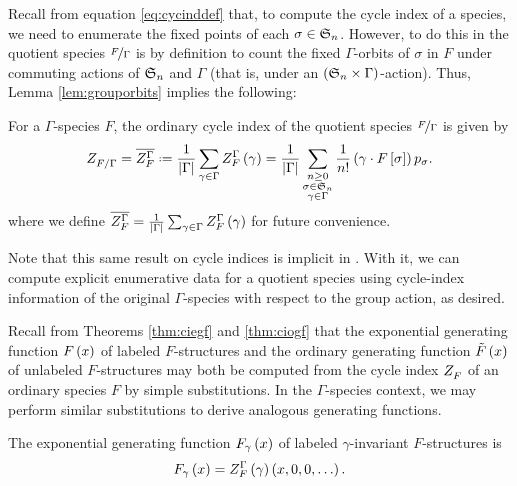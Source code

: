 \documentclass[distribution,draft]{brandiss} %
\numberwithin{section}{chapter}
\numberwithin{figure}{chapter}
\begin{document}
Recall from equation \eqref{eq:cycinddef} that, to compute the cycle index of a species, we need to enumerate the fixed points of each $\sigma \in  \mathfrak{S}_{n} $.
However, to do this in the quotient species $\nicefrac{F}{\Gamma}$ is by definition to count the fixed $\Gamma$-orbits of $\sigma$ in $F$ under commuting actions of $ \mathfrak{S}_{n} $ and $\Gamma$ (that is, under an $\left( { \mathfrak{S}_{n}  \times \Gamma} \right)$-action).
Thus, Lemma \ref{lem:grouporbits} implies the following:
\begin{theorem}\label{thm:qsci}
  For a $\Gamma$-species $F$, the ordinary cycle index of the quotient species $\nicefrac{F}{\Gamma}$ is given by 
  \begin{equation}
    \label{eq:quotcycind}
    \ci{F / \Gamma} = \qgci{\Gamma}{F} \defeq \frac{1}{\abs{\Gamma}} \sum_{\gamma \in \Gamma} \gcielt{\Gamma}{F}{\gamma} = \frac{1}{\abs{\Gamma}} \sum_{\substack{n \geq 0 \\ \sigma \in \symgp{n} \\ \gamma \in \Gamma}} \frac{1}{n!} \pbrac{\gamma \cdot F \sbrac{\sigma}} p_{\sigma}.
  \end{equation}
  where we define $ \overline{  Z_{F}^{{\Gamma} {}}  }  = \frac{1}{\left\vert {\Gamma} \right\vert} \sum_{\gamma \in \Gamma}  Z_{F}^{{\Gamma} {}}  \left( {\gamma} \right)$ for future convenience.
\end{theorem}
Note that this same result on cycle indices is implicit in \cite[\S 2.2.3]{bous:species}.
With it, we can compute explicit enumerative data for a quotient species using cycle-index information of the original $\Gamma$-species with respect to the group action, as desired.

Recall from Theorems \ref{thm:ciegf} and \ref{thm:ciogf} that the exponential generating function $F \left( {x} \right)$ of labeled $F$-structures and the ordinary generating function $\tilde{F} \left( {x} \right)$ of unlabeled $F$-structures may both be computed from the cycle index $ Z_{F}^{} $ of an ordinary species $F$ by simple substitutions.
In the $\Gamma$-species context, we may perform similar substitutions to derive analogous generating functions.

\begin{theorem}
  \label{thm:gciegf}
  The exponential generating function $F_{\gamma} \left( {x} \right)$ of labeled $\gamma$-invariant $F$-structures is
  \begin{equation}
    \label{eq:gciegf}
    F_{\gamma} \left( {x} \right) =  Z_{F}^{{\Gamma} {}} \left( {\gamma} \right)  \left( {x, 0, 0, \dots} \right).
  \end{equation}
\end{theorem}
\end{document}
